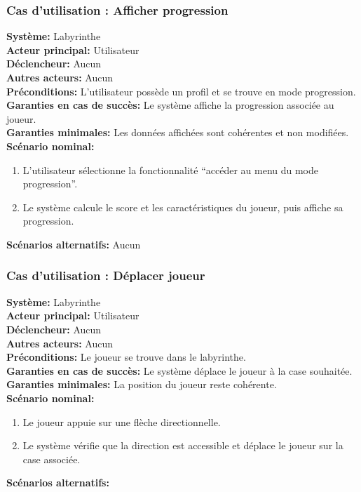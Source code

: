 \documentclass{butexFR}
\begin{document}
\newpage

\subsubsection{Cas d'utilisation : Afficher progression}
\textbf{Système:} Labyrinthe\\
\textbf{Acteur principal:} Utilisateur\\
\textbf{Déclencheur:} Aucun\\
\textbf{Autres acteurs:} Aucun\\
\textbf{Préconditions:} L'utilisateur possède un profil et se trouve en mode progression.\\
\textbf{Garanties en cas de succès:} Le système affiche la progression associée au joueur.\\
\textbf{Garanties minimales:} Les données affichées sont cohérentes et non modifiées.\\
\textbf{Scénario nominal:}
\begin{enumerate}
    \item L'utilisateur sélectionne la fonctionnalité ``accéder au menu du mode progression''.
    \item Le système calcule le score et les caractéristiques du joueur, puis affiche sa progression.
\end{enumerate}
\textbf{Scénarios alternatifs:} Aucun

\newpage

\subsubsection{Cas d'utilisation : Déplacer joueur}
\textbf{Système:} Labyrinthe\\
\textbf{Acteur principal:} Utilisateur\\
\textbf{Déclencheur:} Aucun\\
\textbf{Autres acteurs:} Aucun\\
\textbf{Préconditions:} Le joueur se trouve dans le labyrinthe.\\
\textbf{Garanties en cas de succès:} Le système déplace le joueur à la case souhaitée.\\
\textbf{Garanties minimales:} La position du joueur reste cohérente.\\
\textbf{Scénario nominal:}
\begin{enumerate}
    \item Le joueur appuie sur une flèche directionnelle.
    \item Le système vérifie que la direction est accessible et déplace le joueur sur la case associée.
\end{enumerate}
\textbf{Scénarios alternatifs:}
\end{document}
